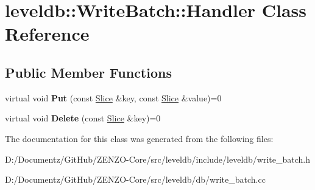 \hypertarget{classleveldb_1_1_write_batch_1_1_handler}{}\section{leveldb\+::Write\+Batch\+::Handler Class Reference}
\label{classleveldb_1_1_write_batch_1_1_handler}
\subsection*{Public Member Functions}
\begin{DoxyCompactItemize}
\item 
\mbox{\label{classleveldb_1_1_write_batch_1_1_handler_ad41d4985db289b94e29921167d206d4b}} 
virtual void {\bfseries Put} (const \mbox{\hyperlink{classleveldb_1_1_slice}{Slice}} \&key, const \mbox{\hyperlink{classleveldb_1_1_slice}{Slice}} \&value)=0
\item 
\mbox{\label{classleveldb_1_1_write_batch_1_1_handler_aeab6526b87bf5b50fb64216b69b34b17}} 
virtual void {\bfseries Delete} (const \mbox{\hyperlink{classleveldb_1_1_slice}{Slice}} \&key)=0
\end{DoxyCompactItemize}


The documentation for this class was generated from the following files\+:\begin{DoxyCompactItemize}
\item 
D\+:/\+Documentz/\+Git\+Hub/\+Z\+E\+N\+Z\+O-\/\+Core/src/leveldb/include/leveldb/write\+\_\+batch.\+h\item 
D\+:/\+Documentz/\+Git\+Hub/\+Z\+E\+N\+Z\+O-\/\+Core/src/leveldb/db/write\+\_\+batch.\+cc\end{DoxyCompactItemize}
